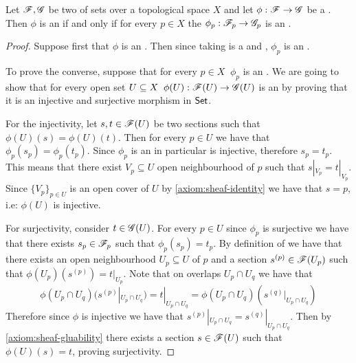 \documentclass[../main.tex]{subfiles}
\begin{document}
\begin{theorem} \label{thm:induced-stalk-isomorphism}
  Let \(\mathscr{F}, \mathscr{G}\) be two  of sets over a topological space \(X\) and let \(\phi: \mathscr{F} \to \mathscr{G}\) be a .
  Then \(\phi\) is an  if and only if for every \(p \in X\) the  \(\phi_{p}: \mathscr{F}_{p} \to \mathscr{G}_{p}\) is an .
\end{theorem}
\begin{proof}
  Suppose first that \(\phi\) is an .
  Then since taking  is a  and , \(\phi_{p}\) is an .

  To prove the converse, suppose that for every \(p \in X \;\; \phi_{p}\) is an .
  We are going to show that for every open set \(U \subseteq X \;\; \phi(U): \mathscr{F}(U) \to \mathscr{G}(U)\) is an  by proving that it is an injective and surjective morphism in \(\mathsf{Set}\).

  For the injectivity, let \(s, t \in \mathscr{F}(U)\) be two sections such that \(\phi(U)(s) = \phi(U)(t)\).
  Then for every \(p \in U\) we have that \(\phi_{p}(s_{p}) = \phi_{p}(t_{p})\).
  Since \(\phi_{p}\) is an  in particular is injective, therefore \(s_{p} = t_{p}\).
  This means that there exist \(V_{p} \subseteq U\) open neighbourhood of \(p\) such that \(s|_{V_{p}} = t|_{V_{p}}\).
  Since \(\{V_{p}\}_{p \in U}\) is an open cover of \(U\) by \ref{axiom:sheaf-identity} we have that \(s = p\), i.e: \(\phi(U)\) is injective.

  For surjectivity, consider \(t \in \mathscr{G}(U)\).
  For every \(p \in U\) since \(\phi_{p}\) is surjective we have that there exists \(s_{p} \in \mathscr{F}_{p}\) such that \(\phi_{p}(s_{p}) = t_{p}\).
  By definition of  we have that there exists an open neighbourhood \(U_{p} \subseteq U\) of \(p\) and a section \(s^{(p)} \in \mathscr{F}(U_{p})\) such that \(\phi(U_{p})(s^{(p)}) = t|_{U_{p}}\).
  Note that on overlaps \(U_{p} \cap U_{q}\) we have that
  \begin{equation*}
    \phi(U_{p} \cap U_{q})(s^{(p)}|_{U_{p} \cap U_{q}}) = t|_{U_{p} \cap U_{q}} = \phi(U_{p} \cap U_{q})(s^{(q)}|_{U_{p} \cap U_{q}})
  \end{equation*}
  Therefore since \(\phi\) is injective we have that \(s^{(p)}|_{U_{p} \cap U_{q}} = s^{(q)}|_{U_{p} \cap U_{q}}\).
  Then by \ref{axiom:sheaf-gluability} there exists a section \(s \in \mathscr{F}(U)\) such that \(\phi(U)(s) = t\), proving surjectivity.
\end{proof}
\end{document}

